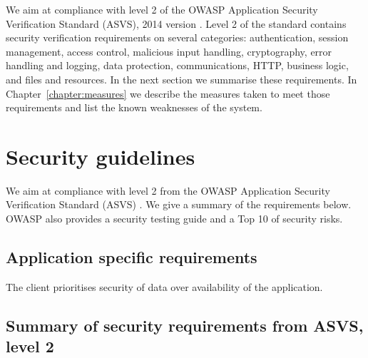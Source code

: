 \documentclass[a4paper]{report}
\begin{document}
We aim at compliance with level 2 of the OWASP Application Security Verification Standard (ASVS), 2014 version \cite{owasp2014:asvs}. Level 2 of the standard contains security verification requirements on several categories: authentication, session management, access control, malicious input handling, cryptography, error handling and logging, data protection, communications, HTTP, business logic, and files and resources.
In the next section we summarise these requirements. In Chapter~\ref{chapter:measures}
we describe the measures taken to meet those requirements and list the known weaknesses of the system.



\section{Security guidelines}

We aim at compliance with level 2 from the OWASP Application Security Verification Standard (ASVS) \cite{owasp2014:asvs}. We give a summary of the requirements below.
OWASP also provides a security testing guide \cite{owasp2013:testing} and
a Top 10 \cite{owasp2013:top10} of security risks. 


\subsection{Application specific requirements}

The client prioritises security of data over availability
of the application.


\subsection{Summary of security requirements from ASVS, level 2}
\end{document}
